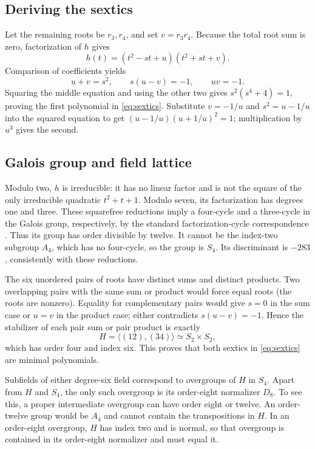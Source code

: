 \documentclass[11pt,letterpaper]{article}
\theoremstyle{definition}
\theoremstyle{remark}
\begin{document}
\subsection{Deriving the sextics}
Let the remaining roots be \(r_3,r_4\), and set \(v=r_3r_4\).
Because the total root sum is zero, factorization of \(h\) gives
\[
 h(t)=(t^2-st+u)(t^2+st+v).
\]
Comparison of coefficients yields
\[
 u+v=s^2,\qquad s(u-v)=-1,\qquad uv=-1.
\]
Squaring the middle equation and using the other two gives
\(s^2(s^4+4)=1\), proving the first polynomial in \eqref{eq:sextics}.
Substitute \(v=-1/u\) and \(s^2=u-1/u\) into the squared equation to get
\((u-1/u)(u+1/u)^2=1\); multiplication by \(u^3\) gives the second.

\subsection{Galois group and field lattice}
Modulo two, \(h\) is irreducible: it has no linear factor and is not the
square of the only irreducible quadratic \(t^2+t+1\). Modulo seven, its
factorization has degrees one and three. These squarefree reductions imply
a four-cycle and a three-cycle in the Galois group, respectively, by the
standard factorization-cycle correspondence \cite[Chapter~4]{milne}.
Thus its group has order divisible by twelve. It cannot be the index-two
subgroup \(A_4\), which has no four-cycle, so the group is \(S_4\).
Its discriminant is \(-283\), consistently with these reductions.

The six unordered pairs of roots have distinct sums and distinct products.
Two overlapping pairs with the same sum or product would force equal
roots (the roots are nonzero). Equality for complementary pairs would give
\(s=0\) in the sum case or \(u=v\) in the product case; either contradicts
\(s(u-v)=-1\). Hence the stabilizer of each pair sum or pair product is
exactly
\[
 H=\langle(12),(34)\rangle\simeq S_2\times S_2,
\]
which has order four and index six. This proves that both sextics in
\eqref{eq:sextics} are minimal polynomials.

Subfields of either degree-six field correspond to overgroups of \(H\)
in \(S_4\). Apart from \(H\) and \(S_4\), the only such overgroup is
its order-eight normalizer \(D_8\). To see this, a proper intermediate
overgroup can have order eight or twelve. An order-twelve group would be
\(A_4\) and cannot contain the transpositions in \(H\). In an order-eight
overgroup, \(H\) has index two and is normal, so that overgroup is contained
in its order-eight normalizer and must equal it.
\end{document}
